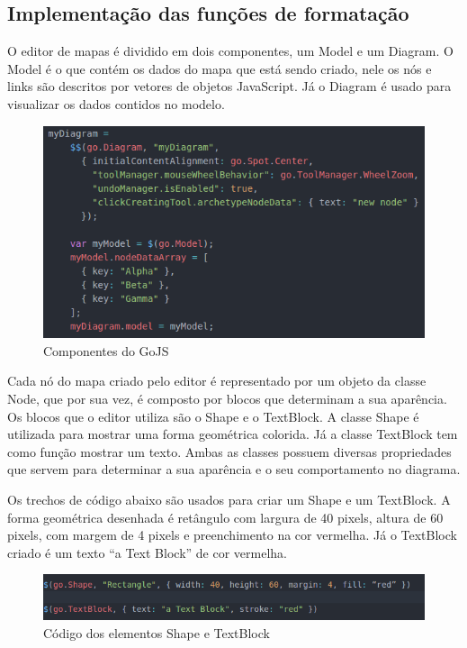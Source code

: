 \documentclass[
	12pt,				%
	openright,			%
	oneside,			%
	a4paper,			%
	english,			%
	french,				%
	spanish,			%
	brazil				%
	]{abntex2}
\begin{document}
\subsection{Implementação das funções de formatação}
O editor de mapas é dividido em dois componentes, um Model e um Diagram. O Model é o que contém os dados do mapa que está sendo criado, nele os nós e links são descritos por vetores de objetos JavaScript. Já o Diagram é usado para visualizar os dados contidos no modelo.
\begin{figure}[htb]
	\caption{\label{fig_gojs} Componentes do GoJS}
	\begin{center}
		\includegraphics[scale=0.7]{gojs.png}
	\end{center}
\end{figure}

Cada nó do mapa criado pelo editor é representado por um objeto da classe Node, que por sua vez, é composto por blocos que determinam a sua aparência. Os blocos que o editor utiliza são o Shape e o TextBlock. A classe Shape é utilizada para mostrar uma forma geométrica colorida. Já a classe TextBlock tem como função mostrar um texto. Ambas as classes possuem diversas propriedades que servem para determinar a sua aparência e o seu comportamento no diagrama.

Os trechos de código abaixo são usados para criar um Shape e um TextBlock. A forma geométrica  desenhada é retângulo com largura de 40 pixels, altura de 60 pixels, com margem de 4 pixels e preenchimento na cor vermelha. Já o TextBlock criado é um texto “a Text Block” de cor vermelha.

\begin{figure}[htb]
	\caption{\label{fig_gojselements} Código dos elementos Shape e TextBlock}
	\begin{center}
		\includegraphics[scale=0.6]{gojselements.png}
	\end{center}
\end{figure}
\end{document}
